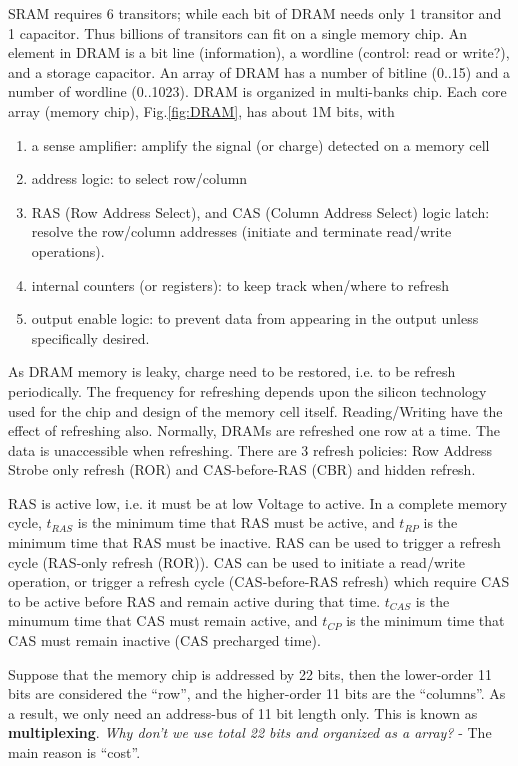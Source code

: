 SRAM requires 6 transitors; while each bit of DRAM needs only 1 transitor and
1 capacitor. Thus billions of transitors can fit on a single memory chip. An
element in DRAM is a bit line (information), a wordline (control: read or write?), and a storage capacitor. An array of DRAM has a number of bitline (0..15) and a number of wordline (0..1023). DRAM is organized in multi-banks
chip. Each core array (memory chip), Fig.\ref{fig:DRAM}, has about 1M bits, with
\begin{enumerate}
  \item a sense amplifier: amplify the signal (or charge) detected on a memory
  cell
  \item address logic: to select row/column
  \item RAS (Row Address Select), and CAS (Column Address Select) logic latch:
  resolve the row/column addresses (initiate and terminate read/write
  operations). 
  \item internal counters (or registers): to keep track when/where to refresh
  \item output enable logic: to prevent data from appearing in the output unless
  specifically desired.
\end{enumerate}

\begin{framed}
As DRAM memory is leaky, charge need to be restored, i.e. to be refresh
periodically. The frequency for refreshing depends upon the silicon technology
used for the chip and design of the memory cell itself. Reading/Writing have
the effect of refreshing also. Normally, DRAMs are refreshed one row at a
time. The data is unaccessible when refreshing. There are 3 refresh policies:
Row Address Strobe only refresh (ROR) and CAS-before-RAS (CBR) and hidden refresh.
\end{framed}

RAS is active low, i.e. it must be at low Voltage to active. In a
complete memory cycle, $t_{RAS}$ is the minimum time that RAS must be active,
and $t_{RP}$ is the minimum time that RAS must be inactive. RAS can be used to
trigger a refresh cycle (RAS-only refresh (ROR)). CAS can be used to initiate a
read/write operation, or trigger a refresh cycle (CAS-before-RAS refresh) which
require CAS to be active before RAS and remain active during that time.
$t_{CAS}$ is the minumum time that CAS must remain active, and $t_{CP}$ is the
minimum time that CAS must remain inactive (CAS precharged time). 

Suppose that the memory chip
is addressed by 22 bits, then the lower-order 11 bits are considered
the ``row'', and the higher-order 11 bits are the ``columns''. As a
result, we only need an address-bus of 11 bit length only. This is known as {\bf multiplexing}.
{\it Why don't we use total 22 bits and organized as a array?}  - The
main reason is ``cost''.

